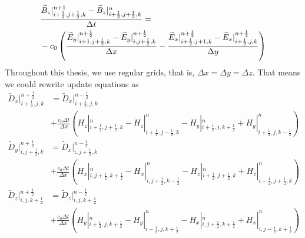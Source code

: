 \begin{equation}
  \begin{split}
    \displaystyle & \frac{\widetilde{B}_z|_{i+\frac{1}{2},j+\frac{1}{2},k}^{n+1} - \widetilde{B}_z|_{i+\frac{1}{2},j+\frac{1}{2},k}^{n}}{\Delta t} = \\
    \displaystyle & - c_0\left(\frac{\widetilde{E}_y|_{i+1,j+\frac{1}{2},k}^{n+\frac{1}{2}} - \widetilde{E}_y|_{i,j+\frac{1}{2},k}^{n+\frac{1}{2}}}{\Delta x} - \frac{\widetilde{E}_x|_{i+\frac{1}{2},j+1,k}^{n+\frac{1}{2}} - \widetilde{E}_x|_{i+\frac{1}{2},j,k}^{n+\frac{1}{2}}}{\Delta y}\right)
  \end{split}
\end{equation}
Throughout this thesis, we use regular grids, that is, $\Delta x = \Delta y = \Delta z$. That means we could rewrite update equations as
\begin{equation}\label{eq:dx3d}
  \begin{split}
    \widetilde{D}_x|_{i+\frac{1}{2},j,k}^{n+\frac{1}{2}} & = \widetilde{D}_x|_{i+\frac{1}{2},j,k}^{n-\frac{1}{2}}\\
    & + \frac{c_0\Delta t}{\Delta x}\left(H_z|_{i+\frac{1}{2},j+\frac{1}{2},k}^{n} - H_z|_{i+\frac{1}{2},j-\frac{1}{2},k}^{n} - H_y|_{i+\frac{1}{2},j,k+\frac{1}{2}}^{n} + H_y|_{i+\frac{1}{2},j,k-\frac{1}{2}}^{n}\right)
  \end{split}
\end{equation}
\begin{equation}
  \begin{split}
    \widetilde{D}_y|_{i,j+\frac{1}{2},k}^{n+\frac{1}{2}} & = \widetilde{D}_x|_{i,j+\frac{1}{2},k}^{n-\frac{1}{2}}\\
    & + \frac{c_0\Delta t}{\Delta x}\left(H_x|_{i,j+\frac{1}{2},k+\frac{1}{2}}^{n} - H_x|_{i,j+\frac{1}{2},k-\frac{1}{2}}^{n} - H_z|_{i+\frac{1}{2},j+\frac{1}{2},k}^{n} + H_z|_{i-\frac{1}{2},j+\frac{1}{2},k}^{n}\right)
  \end{split}
\end{equation}
\begin{equation}\label{eq:dz3d}
  \begin{split}
    \widetilde{D}_z|_{i,j,k+\frac{1}{2}}^{n+\frac{1}{2}} & = \widetilde{D}_z|_{i,j,k+\frac{1}{2}}^{n-\frac{1}{2}}\\
    & + \frac{c_0\Delta t}{\Delta x}\left(H_y|_{i+\frac{1}{2},j,k+\frac{1}{2}}^{n} - H_y|_{i-\frac{1}{2},j,k+\frac{1}{2}}^{n} - H_x|_{i,j+\frac{1}{2},k+\frac{1}{2}}^{n} + H_x|_{i,j-\frac{1}{2},k+\frac{1}{2}}^{n}\right)
  \end{split}
\end{equation}
